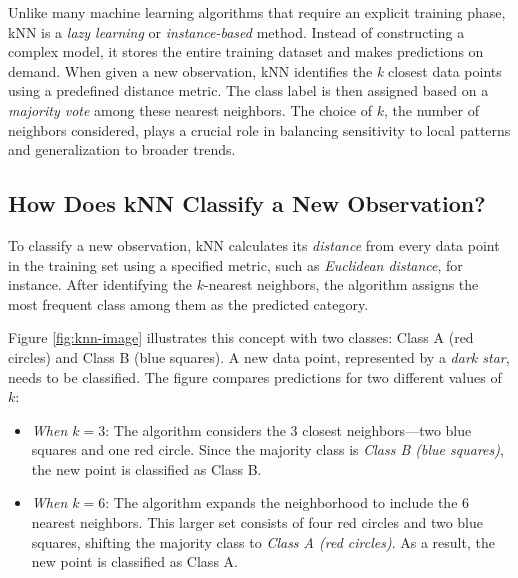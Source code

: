 \documentclass[
]{book}
\providecommand{\tightlist}{%
  \setlength{\itemsep}{0pt}\setlength{\parskip}{0pt}}
\theoremstyle{definition}
\theoremstyle{definition}
\theoremstyle{definition}
\theoremstyle{definition}
\theoremstyle{remark}
\begin{document}
Unlike many machine learning algorithms that require an explicit training phase, kNN is a \emph{lazy learning} or \emph{instance-based} method. Instead of constructing a complex model, it stores the entire training dataset and makes predictions on demand. When given a new observation, kNN identifies the \emph{k} closest data points using a predefined distance metric. The class label is then assigned based on a \emph{majority vote} among these nearest neighbors. The choice of \(k\), the number of neighbors considered, plays a crucial role in balancing sensitivity to local patterns and generalization to broader trends.

\subsection*{How Does kNN Classify a New Observation?}\label{how-does-knn-classify-a-new-observation}

To classify a new observation, kNN calculates its \emph{distance} from every data point in the training set using a specified metric, such as \emph{Euclidean distance}, for instance. After identifying the \(k\)-nearest neighbors, the algorithm assigns the most frequent class among them as the predicted category.

Figure \ref{fig:knn-image} illustrates this concept with two classes: {Class A (red circles)} and {Class B (blue squares)}. A new data point, represented by a \emph{dark star}, needs to be classified. The figure compares predictions for two different values of \(k\):

\begin{itemize}
\tightlist
\item
  \emph{When \(k = 3\)}: The algorithm considers the 3 closest neighbors---two blue squares and one red circle. Since the majority class is \emph{Class B (blue squares)}, the new point is classified as Class B.\\
\item
  \emph{When \(k = 6\)}: The algorithm expands the neighborhood to include the 6 nearest neighbors. This larger set consists of four red circles and two blue squares, shifting the majority class to \emph{Class A (red circles)}. As a result, the new point is classified as Class A.
\end{itemize}
\end{document}
